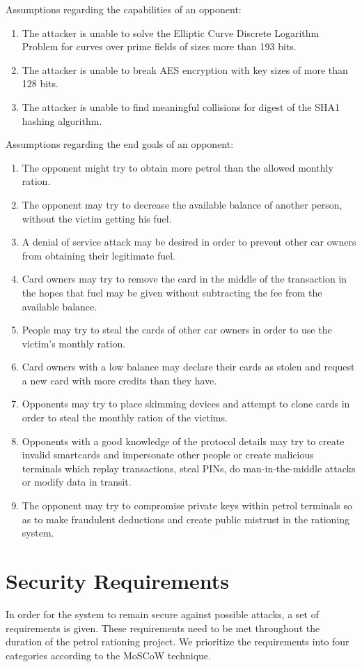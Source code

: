 \documentclass[a4paper,10pt]{llncs}
\begin{document}
Assumptions regarding the capabilities of an opponent:
\begin{enumerate}
	\item The attacker is unable to solve the Elliptic Curve Discrete Logarithm Problem for curves over prime fields of sizes more than 193 bits.
	\item The attacker is unable to break AES encryption with key sizes of more than 128 bits.
	\item The attacker is unable to find meaningful collisions for digest of the SHA1 hashing algorithm.
\end{enumerate}

Assumptions regarding the end goals of an opponent:
\begin{enumerate}
	\item The opponent might try to obtain more petrol than the allowed monthly ration.
	\item The opponent may try to decrease the available balance of another person, without the victim getting his fuel.
	\item A denial of service attack may be desired in order to prevent other car owners from obtaining their legitimate fuel.
	\item Card owners may try to remove the card in the middle of the transaction in the hopes that fuel may be given without subtracting the fee from the available balance.
	\item People may try to steal the cards of other car owners in order to use the victim's monthly ration.
	\item Card owners with a low balance may declare their cards as stolen and request a new card with more credits than they have.
	\item Opponents may try to place skimming devices and attempt to clone cards in order to steal the monthly ration of the victims.
	\item Opponents with a good knowledge of the protocol details may try to create invalid smartcards and impersonate other people or create malicious terminals which replay transactions, steal PINs, do man-in-the-middle attacks or modify data in transit.
	\item The opponent may try to compromise private keys within petrol terminals so as to make fraudulent deductions and create public mistrust in the rationing system.
\end{enumerate}

\section{Security Requirements}
In order for the system to remain secure against possible attacks, a set of requirements is given. These requirements need to be met throughout the duration of the petrol rationing project. We prioritize the requirements into four categories according to the MoSCoW technique.
\end{document}
